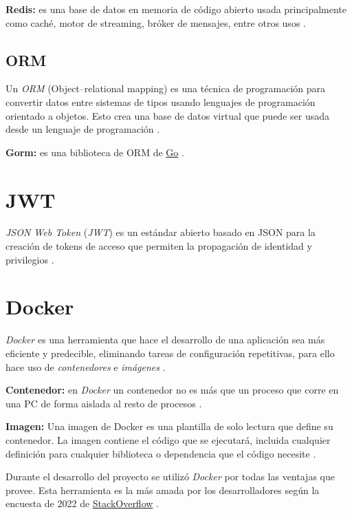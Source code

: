 \textbf{Redis:} es una base de datos en memoria de código abierto usada principalmente como caché, motor de streaming, bróker de mensajes, entre otros usos \cite{redis}.

\subsection{ORM}
Un \textit{ORM} (Object–relational mapping) es una técnica de programación para convertir datos entre sistemas de tipos usando lenguajes de programación orientado a objetos. Esto crea una base de datos virtual que puede ser usada desde un lenguaje de programación \cite{orm}.
\newline

\textbf{Gorm:} es una biblioteca de ORM de \href{https://go.dev/}{Go} \cite{gorm}.

\section{JWT}

\textit{JSON Web Token} (\textit{JWT}) es un estándar abierto basado en JSON para la creación de tokens de acceso que permiten la propagación de identidad y privilegios \cite{jwt}.

\section{Docker}

\textit{Docker} es una herramienta que hace el desarrollo de una aplicación sea más eficiente y predecible, eliminando tareas de configuración repetitivas, para ello hace uso de \textit{contenedores} e \textit{imágenes} \cite{docker}.
\newline

\textbf{Contenedor:} en \textit{Docker} un contenedor no es más que un proceso que corre en una PC de forma aislada al resto de procesos \cite{docker_docs}.
\newline

\textbf{Imagen:} Una imagen de Docker es una plantilla de solo lectura que define su contenedor. La imagen contiene el código que se ejecutará, incluida cualquier definición para cualquier biblioteca o dependencia que el código necesite \cite{docker_docs}.
\newline

Durante el desarrollo del proyecto se utilizó \textit{Docker} por todas las ventajas que provee. Esta herramienta es la más amada por los desarrolladores según la encuesta de 2022 de \href{https://stackoverflow.com/}{StackOverflow} \cite{encuesta2022}.
